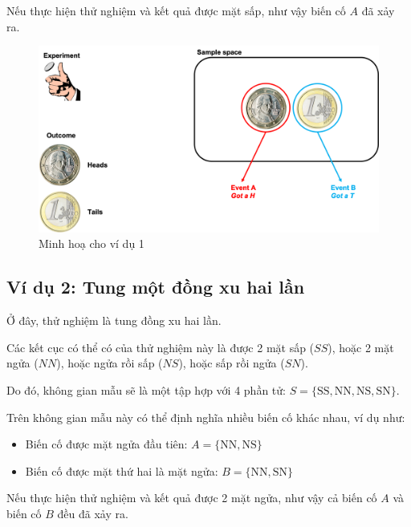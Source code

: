 \documentclass[
]{book}
\providecommand{\tightlist}{%
  \setlength{\itemsep}{0pt}\setlength{\parskip}{0pt}}
\begin{document}
Nếu thực hiện thử nghiệm và kết quả được mặt sấp, như vậy biến cố \(A\) đã xảy ra.

\begin{figure}

{\centering \includegraphics[width=1\linewidth]{figures/Picture01} 

}

\caption{Minh hoạ cho ví dụ 1}\label{fig:example1}
\end{figure}

\hypertarget{vuxed-dux1ee5-2-tung-mux1ed9t-ux111ux1ed3ng-xu-hai-lux1ea7n}{%
\subsection{Ví dụ 2: Tung một đồng xu hai lần}\label{vuxed-dux1ee5-2-tung-mux1ed9t-ux111ux1ed3ng-xu-hai-lux1ea7n}}

Ở đây, thử nghiệm là tung đồng xu hai lần.

Các kết cục có thể có của thử nghiệm này là được 2 mặt sấp (\(SS\)), hoặc 2 mặt ngửa (\(NN\)), hoặc ngửa rồi sấp (\(NS\)), hoặc sấp rồi ngửa (\(SN\)).

Do đó, không gian mẫu sẽ là một tập hợp với 4 phần tử: \(S = \{\text{SS},\text{NN},\text{NS},\text{SN}\}\).

Trên không gian mẫu này có thể định nghĩa nhiều biến cố khác nhau, ví dụ như:

\begin{itemize}
\tightlist
\item
  Biến cố được mặt ngửa đầu tiên: \(A = \{\text{NN},\text{NS}\}\)
\item
  Biến cố được mặt thứ hai là mặt ngửa: \(B = \{\text{NN},\text{SN}\}\)
\end{itemize}

Nếu thực hiện thử nghiệm và kết quả được 2 mặt ngửa, như vậy cả biến cố \(A\) và biến cố \(B\) đều đã xảy ra.
\end{document}
